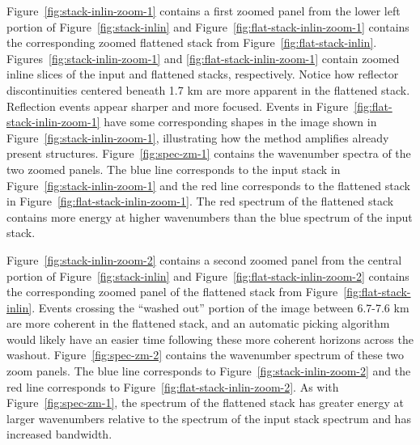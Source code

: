 Figure~\ref{fig:stack-inlin-zoom-1} contains a first zoomed panel from the lower left portion of Figure~\ref{fig:stack-inlin} and Figure~\ref{fig:flat-stack-inlin-zoom-1} contains the corresponding zoomed flattened stack from Figure~\ref{fig:flat-stack-inlin}. 
Figures~\ref{fig:stack-inlin-zoom-1} and \ref{fig:flat-stack-inlin-zoom-1} contain zoomed inline slices of the input and flattened stacks, respectively.
Notice how reflector discontinuities centered beneath 1.7 km are more apparent in the flattened stack.  Reflection events appear sharper and more focused.  Events in Figure~\ref{fig:flat-stack-inlin-zoom-1} have some corresponding shapes in the image shown in Figure~\ref{fig:stack-inlin-zoom-1}, illustrating how the method amplifies already present structures.  Figure~\ref{fig:spec-zm-1} contains the wavenumber spectra of the two zoomed panels. The blue line corresponds to the input stack in Figure~\ref{fig:stack-inlin-zoom-1} and the red line corresponds to the flattened stack in Figure~\ref{fig:flat-stack-inlin-zoom-1}.  The red spectrum of the flattened stack contains more energy at higher wavenumbers than the blue spectrum of the input stack.



Figure~\ref{fig:stack-inlin-zoom-2} contains a second zoomed panel from the central portion of Figure~\ref{fig:stack-inlin} and Figure~\ref{fig:flat-stack-inlin-zoom-2} contains the corresponding zoomed panel of the flattened stack from Figure~\ref{fig:flat-stack-inlin}.  Events crossing the ``washed out'' portion of the image between 6.7-7.6 km are more coherent in the flattened stack, and an automatic picking algorithm would likely have an easier time following these more coherent horizons across the washout.  Figure~\ref{fig:spec-zm-2} contains the wavenumber spectrum of these two zoom panels.  The blue line corresponds to Figure~\ref{fig:stack-inlin-zoom-2} and the red line corresponds to Figure~\ref{fig:flat-stack-inlin-zoom-2}.  As with Figure~\ref{fig:spec-zm-1}, the spectrum of the flattened stack has greater energy at larger wavenumbers relative to the spectrum of the input stack spectrum and has increased bandwidth.


